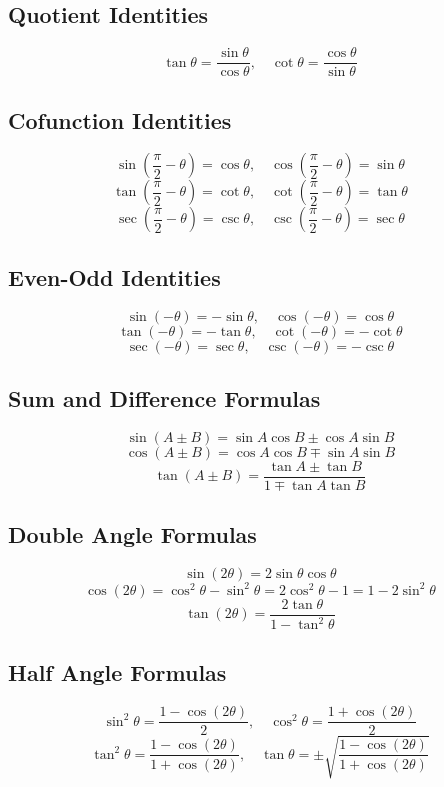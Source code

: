\documentclass[12pt]{article}
\begin{document}
\subsection*{Quotient Identities}
\[
\tan \theta = \frac{\sin \theta}{\cos \theta}, 
\quad \cot \theta = \frac{\cos \theta}{\sin \theta}
\]

\subsection*{Cofunction Identities}
\[
\sin \left( \frac{\pi}{2} - \theta \right) = \cos \theta, 
\quad \cos \left( \frac{\pi}{2} - \theta \right) = \sin \theta
\]
\[
\tan \left( \frac{\pi}{2} - \theta \right) = \cot \theta, 
\quad \cot \left( \frac{\pi}{2} - \theta \right) = \tan \theta
\]
\[
\sec \left( \frac{\pi}{2} - \theta \right) = \csc \theta, 
\quad \csc \left( \frac{\pi}{2} - \theta \right) = \sec \theta
\]

\subsection*{Even-Odd Identities}
\[
\sin(-\theta) = -\sin \theta, \quad \cos(-\theta) = \cos \theta
\]
\[
\tan(-\theta) = -\tan \theta, \quad \cot(-\theta) = -\cot \theta
\]
\[
\sec(-\theta) = \sec \theta, \quad \csc(-\theta) = -\csc \theta
\]

\subsection*{Sum and Difference Formulas}
\[
\sin(A \pm B) = \sin A \cos B \pm \cos A \sin B
\]
\[
\cos(A \pm B) = \cos A \cos B \mp \sin A \sin B
\]
\[
\tan(A \pm B) = \frac{\tan A \pm \tan B}{1 \mp \tan A \tan B}
\]

\subsection*{Double Angle Formulas}
\[
\sin(2\theta) = 2 \sin \theta \cos \theta
\]
\[
\cos(2\theta) = \cos^2 \theta - \sin^2 \theta = 2\cos^2 \theta - 1 = 1 - 2\sin^2 \theta
\]
\[
\tan(2\theta) = \frac{2\tan \theta}{1 - \tan^2 \theta}
\]

\subsection*{Half Angle Formulas}
\[
\sin^2 \theta = \frac{1 - \cos(2\theta)}{2}, 
\quad 
\cos^2 \theta = \frac{1 + \cos(2\theta)}{2}
\]
\[
\tan^2 \theta = \frac{1 - \cos(2\theta)}{1 + \cos(2\theta)}, \quad
\tan \theta = \pm \sqrt{\frac{1 - \cos(2\theta)}{1 + \cos(2\theta)}}
\]
\end{document}
